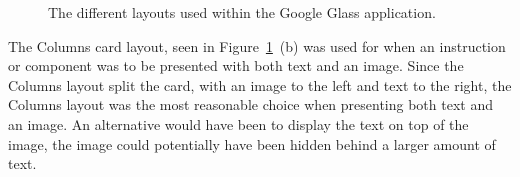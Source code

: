	\begin{figure}[ht!]
		\centering
   		 \qquad
   		 \qquad
    		\qquad
   		 \qquad
		\caption{The different layouts used within the Google Glass application.}
		\label{fig:cardLayout}
	\end{figure}

The Columns card layout, seen in Figure~\ref{fig:cardLayout}~(b) was used for when an instruction or component was to be presented with both text and an image. Since the Columns layout split the card, with an image to the left and text to the right, the Columns layout was the most reasonable choice when presenting both text and an image. An alternative would have been to display the text on top of the image, the image could potentially have been hidden behind a larger amount of text. 

